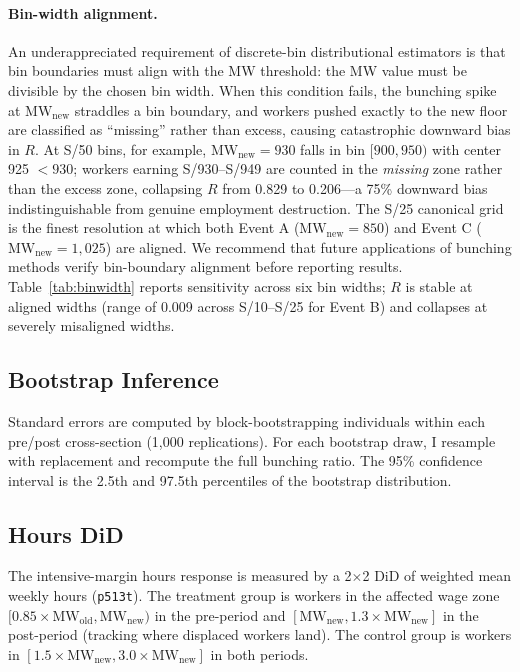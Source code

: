 \documentclass[12pt]{article}
\begin{document}
\paragraph{Bin-width alignment.} An underappreciated requirement of discrete-bin distributional estimators is that bin boundaries must align with the MW threshold: the MW value must be divisible by the chosen bin width. When this condition fails, the bunching spike at $\text{MW}_\text{new}$ straddles a bin boundary, and workers pushed exactly to the new floor are classified as ``missing'' rather than excess, causing catastrophic downward bias in $R$. At S/50 bins, for example, $\text{MW}_\text{new} = 930$ falls in bin $[900, 950)$ with center 925 $< 930$; workers earning S/930--S/949 are counted in the \textit{missing} zone rather than the excess zone, collapsing $R$ from 0.829 to 0.206---a 75\% downward bias indistinguishable from genuine employment destruction. The S/25 canonical grid is the finest resolution at which both Event A ($\text{MW}_\text{new} = 850$) and Event C ($\text{MW}_\text{new} = 1{,}025$) are aligned. We recommend that future applications of bunching methods verify bin-boundary alignment before reporting results. Table~\ref{tab:binwidth} reports sensitivity across six bin widths; $R$ is stable at aligned widths (range of 0.009 across S/10--S/25 for Event B) and collapses at severely misaligned widths.

\subsection{Bootstrap Inference}

Standard errors are computed by block-bootstrapping individuals within each pre/post cross-section (1,000 replications). For each bootstrap draw, I resample with replacement and recompute the full bunching ratio. The 95\% confidence interval is the 2.5th and 97.5th percentiles of the bootstrap distribution.

\subsection{Hours DiD}

The intensive-margin hours response is measured by a 2$\times$2 DiD of weighted mean weekly hours (\texttt{p513t}). The treatment group is workers in the affected wage zone $[0.85 \times \text{MW}_\text{old}, \text{MW}_\text{new})$ in the pre-period and $[\text{MW}_\text{new}, 1.3 \times \text{MW}_\text{new}]$ in the post-period (tracking where displaced workers land). The control group is workers in $[1.5 \times \text{MW}_\text{new}, 3.0 \times \text{MW}_\text{new}]$ in both periods.
\end{document}
